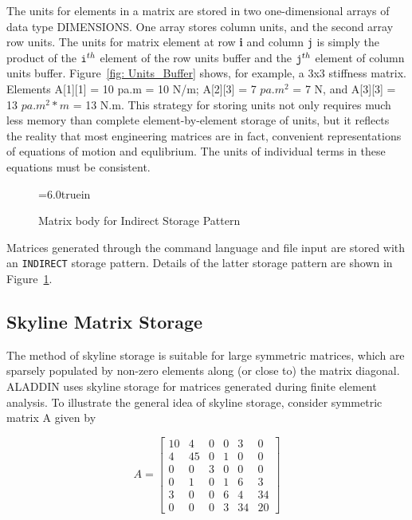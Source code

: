 \vspace{0.15 in}
\noindent\hspace{0.5 in}
The units for elements in a matrix are stored
in two one-dimensional arrays of data type DIMENSIONS.
One array stores column units, and the second array row units.
The units for matrix element at row {\bf i} and column {\tt j}
is simply the product of the ${\tt i}^{th}$ element of the
row units buffer and the ${\tt j}^{th}$ element of column units buffer.
Figure~\ref{fig: Units_Buffer} shows, for example, a 3x3 stiffness matrix.
Elements A[1][1] = 10 pa.m = 10 N/m; A[2][3] = 7
$pa.m^2 $ = 7 N, and A[3][3] = 13 $ pa.m^2*m $ = 13 N.m.
This strategy for storing units not only requires much less
memory than complete element-by-element storage of units,
but it reflects the reality that most engineering matrices
are in fact, convenient representations of equations of motion and equlibrium.
The units of individual terms in these equations must be consistent.


\begin{figure}[h]
\vspace{0.10 in}
\epsfxsize=6.0truein
\centerline{}
\caption{Matrix body for Indirect Storage Pattern}
\label{fig: my-chapter2-fig2}
\end{figure}

\vspace{0.15 in}
\noindent\hspace{0.5 in}
Matrices generated through the command language and file input are
stored with an {\tt INDIRECT} storage pattern.
Details of the latter storage pattern are shown
in Figure~\ref{fig: my-chapter2-fig2}.

\subsection{Skyline Matrix Storage}

\vspace{0.15 in}
\noindent\hspace{0.5 in}
The method of skyline storage is suitable for large symmetric matrices,
which are sparsely populated by non-zero
elements along (or close to) the matrix diagonal.
ALADDIN uses skyline storage for matrices
generated during finite element analysis.
To illustrate the general idea of skyline storage,
consider symmetric matrix A given by

\[ A = \left [
\begin{array}{rrrrrr}
 10 &  4 & 0 & 0 &  3 &  0 \\
  4 & 45 & 0 & 1 &  0 &  0 \\
  0 &  0 & 3 & 0 &  0 &  0 \\
  0 &  1 & 0 & 1 &  6 &  3 \\
  3 &  0 & 0 & 6 &  4 & 34 \\
  0 &  0 & 0 & 3 & 34 & 20 
\end{array}
\right] \]

